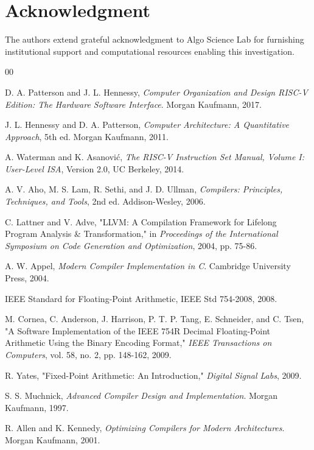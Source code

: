 \documentclass[conference,10pt,twocolumn]{IEEEtran}
\begin{document}
\section*{Acknowledgment}

The authors extend grateful acknowledgment to Algo Science Lab for furnishing institutional support and computational resources enabling this investigation.

\begin{thebibliography}{00}

 D. A. Patterson and J. L. Hennessy, \emph{Computer Organization and Design RISC-V Edition: The Hardware Software Interface}. Morgan Kaufmann, 2017.

 J. L. Hennessy and D. A. Patterson, \emph{Computer Architecture: A Quantitative Approach}, 5th ed. Morgan Kaufmann, 2011.

 A. Waterman and K. Asanović, \emph{The RISC-V Instruction Set Manual, Volume I: User-Level ISA}, Version 2.0, UC Berkeley, 2014.

 A. V. Aho, M. S. Lam, R. Sethi, and J. D. Ullman, \emph{Compilers: Principles, Techniques, and Tools}, 2nd ed. Addison-Wesley, 2006.

 C. Lattner and V. Adve, "LLVM: A Compilation Framework for Lifelong Program Analysis \& Transformation," in \emph{Proceedings of the International Symposium on Code Generation and Optimization}, 2004, pp. 75-86.

 A. W. Appel, \emph{Modern Compiler Implementation in C}. Cambridge University Press, 2004.

 IEEE Standard for Floating-Point Arithmetic, IEEE Std 754-2008, 2008.

 M. Cornea, C. Anderson, J. Harrison, P. T. P. Tang, E. Schneider, and C. Tsen, "A Software Implementation of the IEEE 754R Decimal Floating-Point Arithmetic Using the Binary Encoding Format," \emph{IEEE Transactions on Computers}, vol. 58, no. 2, pp. 148-162, 2009.

 R. Yates, "Fixed-Point Arithmetic: An Introduction," \emph{Digital Signal Labs}, 2009.

 S. S. Muchnick, \emph{Advanced Compiler Design and Implementation}. Morgan Kaufmann, 1997.

 R. Allen and K. Kennedy, \emph{Optimizing Compilers for Modern Architectures}. Morgan Kaufmann, 2001.


\end{thebibliography}
\end{document}
